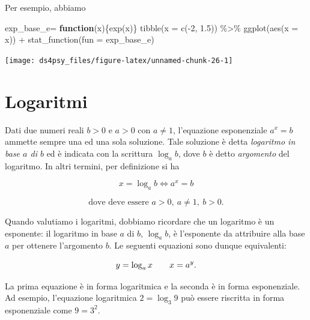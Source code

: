 \documentclass[
  11pt,
]{krantz}
\makeatletter
\newenvironment{Shaded}{\begin{snugshade}}{\end{snugshade}}
\newcommand{\AttributeTok}[1]{\textcolor[rgb]{0.61,0.61,0.61}{#1}}
\newcommand{\ControlFlowTok}[1]{\textcolor[rgb]{0.27,0.27,0.27}{\textbf{#1}}}
\newcommand{\DecValTok}[1]{\textcolor[rgb]{0.06,0.06,0.06}{#1}}
\newcommand{\FloatTok}[1]{\textcolor[rgb]{0.06,0.06,0.06}{#1}}
\newcommand{\FunctionTok}[1]{\textcolor[rgb]{0,0,0}{#1}}
\newcommand{\NormalTok}[1]{#1}
\newcommand{\OtherTok}[1]{\textcolor[rgb]{0.37,0.37,0.37}{#1}}
\newcommand{\SpecialCharTok}[1]{\textcolor[rgb]{0,0,0}{#1}}
\newenvironment{kframe}{%
\medskip{}
\setlength{\fboxsep}{.8em}
 \def\at@end@of@kframe{}%
 \ifinner\ifhmode%
  \def\at@end@of@kframe{\end{minipage}}%
  \begin{minipage}{\columnwidth}%
 \fi\fi%
 \def\FrameCommand##1{\hskip\@totalleftmargin \hskip-\fboxsep
 \colorbox{shadecolor}{##1}\hskip-\fboxsep
     \hskip-\linewidth \hskip-\@totalleftmargin \hskip\columnwidth}%
 \MakeFramed {\advance\hsize-\width
   \@totalleftmargin\z@ \linewidth\hsize
   \@setminipage}}%
 {\par\unskip\endMakeFramed%
 \at@end@of@kframe}
\renewenvironment{Shaded}{\begin{kframe}}{\end{kframe}}
\theoremstyle{definition}
\theoremstyle{definition}
\theoremstyle{definition}
\theoremstyle{definition}
\theoremstyle{remark}
\makeatother
\begin{document}
Per esempio, abbiamo

\begin{Shaded}
\begin{Highlighting}[]
\NormalTok{exp\_base\_e}\OtherTok{=} \ControlFlowTok{function}\NormalTok{(x)\{}\FunctionTok{exp}\NormalTok{(x)\}}
\FunctionTok{tibble}\NormalTok{(}\AttributeTok{x =} \FunctionTok{c}\NormalTok{(}\SpecialCharTok{{-}}\DecValTok{2}\NormalTok{, }\FloatTok{1.5}\NormalTok{)) }\SpecialCharTok{\%\textgreater{}\%}
\FunctionTok{ggplot}\NormalTok{(}\FunctionTok{aes}\NormalTok{(}\AttributeTok{x =}\NormalTok{ x)) }\SpecialCharTok{+}
  \FunctionTok{stat\_function}\NormalTok{(}\AttributeTok{fun =}\NormalTok{ exp\_base\_e)}
\end{Highlighting}
\end{Shaded}

\begin{center}\texttt{[image: ds4psy\_files/figure-latex/unnamed-chunk-26-1]} \end{center}

\hypertarget{logaritmi}{%
\section*{Logaritmi}\label{logaritmi}}


Dati due numeri reali \(b > 0\) e \(a > 0\) con \(a \neq 1\), l'equazione esponenziale \(a^x = b\) ammette sempre una ed una sola soluzione. Tale soluzione è detta \emph{logaritmo in base \(a\) di \(b\)} ed è indicata con la scrittura \(\log_a b\), dove \(b\) è detto \emph{argomento} del logaritmo. In altri termini, per definizione si ha

\[
x = \log_a b \Longleftrightarrow a^x = b
\]

\[
\text{dove deve essere } a > 0, \ a \neq 1,\ b > 0.
\]

Quando valutiamo i logaritmi, dobbiamo ricordare che un logaritmo è un esponente: il logaritmo in base \(a\) di \(b\), \(\log_a b\), è l'esponente da attribuire alla base \(a\) per ottenere l'argomento \(b\). Le seguenti equazioni sono dunque equivalenti:

\begin{equation}
y = \log_a x \qquad x = a^y.\notag
\end{equation}

La prima equazione è in forma logaritmica e la seconda è in forma esponenziale. Ad esempio, l'equazione logaritmica \(2 = \log_3 9\) può essere riscritta in forma esponenziale come \(9 = 3^2\).
\end{document}

